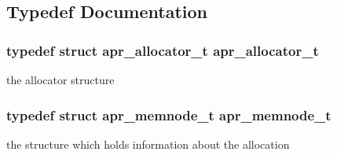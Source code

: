 \subsection{Typedef Documentation}
\hypertarget{group__apr__allocator_ga1ceabfd30fcfc455e47d052d2a24244b}{
\subsubsection[{apr\-\_\-allocator\-\_\-t}]{\setlength{\rightskip}{0pt plus 5cm}typedef struct {\bf apr\-\_\-allocator\-\_\-t} {\bf apr\-\_\-allocator\-\_\-t}}}\label{group__apr__allocator_ga1ceabfd30fcfc455e47d052d2a24244b}
the allocator structure \hypertarget{group__apr__allocator_ga3b6437036dfcdffbf87ad4677c818211}{
\subsubsection[{apr\-\_\-memnode\-\_\-t}]{\setlength{\rightskip}{0pt plus 5cm}typedef struct {\bf apr\-\_\-memnode\-\_\-t} {\bf apr\-\_\-memnode\-\_\-t}}}\label{group__apr__allocator_ga3b6437036dfcdffbf87ad4677c818211}
the structure which holds information about the allocation 

